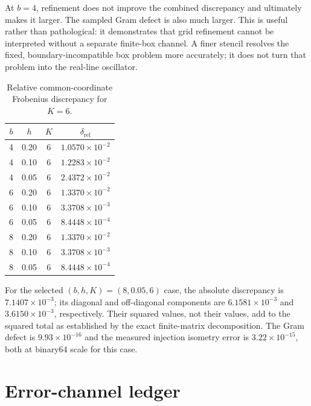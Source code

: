 \documentclass[11pt]{article}
\begin{document}
At $b=4$, refinement does not improve the combined discrepancy and ultimately makes
it larger.  The sampled Gram defect is also much larger.  This is useful rather than
pathological: it demonstrates that grid refinement cannot be interpreted without a
separate finite-box channel.  A finer stencil resolves the fixed, boundary-incompatible
box problem more accurately; it does not turn that problem into the real-line
oscillator.

\begin{table}[ht]
\centering
\begin{tabular}{@{}cccc@{}}
\toprule
$b$ & $h$ & $K$ & $\delta_{\mathrm{rel}}$ \\
\midrule
4 & 0.20 & 6 & $1.0570\times10^{-2}$ \\
4 & 0.10 & 6 & $1.2283\times10^{-2}$ \\
4 & 0.05 & 6 & $2.4372\times10^{-2}$ \\
6 & 0.20 & 6 & $1.3370\times10^{-2}$ \\
6 & 0.10 & 6 & $3.3708\times10^{-3}$ \\
6 & 0.05 & 6 & $8.4448\times10^{-4}$ \\
8 & 0.20 & 6 & $1.3370\times10^{-2}$ \\
8 & 0.10 & 6 & $3.3708\times10^{-3}$ \\
8 & 0.05 & 6 & $8.4448\times10^{-4}$ \\
\bottomrule
\end{tabular}
\caption{Relative common-coordinate Frobenius discrepancy for $K=6$.}
\label{tab:k6-results}
\end{table}

For the selected $(b,h,K)=(8,0.05,6)$ case, the absolute discrepancy is
$7.1407\times10^{-3}$; its diagonal and off-diagonal components are
$6.1581\times10^{-3}$ and $3.6150\times10^{-3}$, respectively.  Their squared values,
not their values, add to the squared total as established by the exact finite-matrix
decomposition.  The Gram defect is $9.93\times10^{-16}$ and the measured injection
isometry error is $3.22\times10^{-15}$, both at binary64 scale for this case.

\section{Error-channel ledger}
\end{document}
